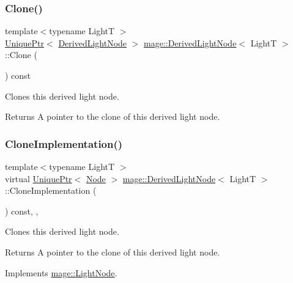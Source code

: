 \subsubsection{\texorpdfstring{Clone()}{Clone()}}
{\footnotesize\ttfamily template$<$typename LightT $>$ \\
\hyperlink{namespacemage_a3316d7143a973e37adf1110f2e80ca31}{Unique\+Ptr}$<$ \hyperlink{classmage_1_1_derived_light_node}{Derived\+Light\+Node} $>$ \hyperlink{classmage_1_1_derived_light_node}{mage\+::\+Derived\+Light\+Node}$<$ LightT $>$\+::Clone (\begin{DoxyParamCaption}{ }\end{DoxyParamCaption}) const}

Clones this derived light node.

\begin{DoxyReturn}{Returns}
A pointer to the clone of this derived light node. 
\end{DoxyReturn}
\hypertarget{classmage_1_1_derived_light_node_acf8858989780bf45a45c55a7c5564314}{}\label{classmage_1_1_derived_light_node_acf8858989780bf45a45c55a7c5564314} 
\subsubsection{\texorpdfstring{Clone\+Implementation()}{CloneImplementation()}}
{\footnotesize\ttfamily template$<$typename LightT $>$ \\
virtual \hyperlink{namespacemage_a3316d7143a973e37adf1110f2e80ca31}{Unique\+Ptr}$<$ \hyperlink{classmage_1_1_node}{Node} $>$ \hyperlink{classmage_1_1_derived_light_node}{mage\+::\+Derived\+Light\+Node}$<$ LightT $>$\+::Clone\+Implementation (\begin{DoxyParamCaption}{ }\end{DoxyParamCaption}) const\hspace{0.3cm}{\ttfamily [override]}, {\ttfamily [private]}, {\ttfamily [virtual]}}

Clones this derived light node.

\begin{DoxyReturn}{Returns}
A pointer to the clone of this derived light node. 
\end{DoxyReturn}


Implements \hyperlink{classmage_1_1_light_node_aea97601d0a4b8073a1c655ca334af242}{mage\+::\+Light\+Node}.

